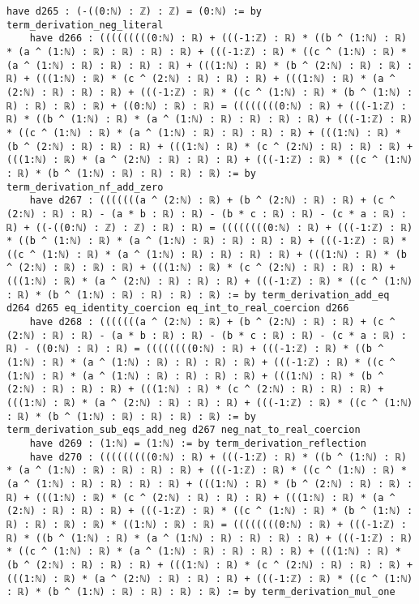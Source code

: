 \documentclass{article}
\begin{document}
\begin{tcolorbox}[colback=white!10, width=\linewidth]
\begin{lstlisting}[language=Lean4]
    have d265 : (-((0:ℕ) : ℤ) : ℤ) = (0:ℕ) := by term_derivation_neg_literal
    have d266 : (((((((((0:ℕ) : ℝ) + (((-1:ℤ) : ℝ) * ((b ^ (1:ℕ) : ℝ) * (a ^ (1:ℕ) : ℝ) : ℝ) : ℝ) : ℝ) + (((-1:ℤ) : ℝ) * ((c ^ (1:ℕ) : ℝ) * (a ^ (1:ℕ) : ℝ) : ℝ) : ℝ) : ℝ) + (((1:ℕ) : ℝ) * (b ^ (2:ℕ) : ℝ) : ℝ) : ℝ) + (((1:ℕ) : ℝ) * (c ^ (2:ℕ) : ℝ) : ℝ) : ℝ) + (((1:ℕ) : ℝ) * (a ^ (2:ℕ) : ℝ) : ℝ) : ℝ) + (((-1:ℤ) : ℝ) * ((c ^ (1:ℕ) : ℝ) * (b ^ (1:ℕ) : ℝ) : ℝ) : ℝ) : ℝ) + ((0:ℕ) : ℝ) : ℝ) = ((((((((0:ℕ) : ℝ) + (((-1:ℤ) : ℝ) * ((b ^ (1:ℕ) : ℝ) * (a ^ (1:ℕ) : ℝ) : ℝ) : ℝ) : ℝ) + (((-1:ℤ) : ℝ) * ((c ^ (1:ℕ) : ℝ) * (a ^ (1:ℕ) : ℝ) : ℝ) : ℝ) : ℝ) + (((1:ℕ) : ℝ) * (b ^ (2:ℕ) : ℝ) : ℝ) : ℝ) + (((1:ℕ) : ℝ) * (c ^ (2:ℕ) : ℝ) : ℝ) : ℝ) + (((1:ℕ) : ℝ) * (a ^ (2:ℕ) : ℝ) : ℝ) : ℝ) + (((-1:ℤ) : ℝ) * ((c ^ (1:ℕ) : ℝ) * (b ^ (1:ℕ) : ℝ) : ℝ) : ℝ) : ℝ) := by term_derivation_nf_add_zero
    have d267 : (((((((a ^ (2:ℕ) : ℝ) + (b ^ (2:ℕ) : ℝ) : ℝ) + (c ^ (2:ℕ) : ℝ) : ℝ) - (a * b : ℝ) : ℝ) - (b * c : ℝ) : ℝ) - (c * a : ℝ) : ℝ) + ((-((0:ℕ) : ℤ) : ℤ) : ℝ) : ℝ) = ((((((((0:ℕ) : ℝ) + (((-1:ℤ) : ℝ) * ((b ^ (1:ℕ) : ℝ) * (a ^ (1:ℕ) : ℝ) : ℝ) : ℝ) : ℝ) + (((-1:ℤ) : ℝ) * ((c ^ (1:ℕ) : ℝ) * (a ^ (1:ℕ) : ℝ) : ℝ) : ℝ) : ℝ) + (((1:ℕ) : ℝ) * (b ^ (2:ℕ) : ℝ) : ℝ) : ℝ) + (((1:ℕ) : ℝ) * (c ^ (2:ℕ) : ℝ) : ℝ) : ℝ) + (((1:ℕ) : ℝ) * (a ^ (2:ℕ) : ℝ) : ℝ) : ℝ) + (((-1:ℤ) : ℝ) * ((c ^ (1:ℕ) : ℝ) * (b ^ (1:ℕ) : ℝ) : ℝ) : ℝ) : ℝ) := by term_derivation_add_eq d264 d265 eq_identity_coercion eq_int_to_real_coercion d266
    have d268 : (((((((a ^ (2:ℕ) : ℝ) + (b ^ (2:ℕ) : ℝ) : ℝ) + (c ^ (2:ℕ) : ℝ) : ℝ) - (a * b : ℝ) : ℝ) - (b * c : ℝ) : ℝ) - (c * a : ℝ) : ℝ) - ((0:ℕ) : ℝ) : ℝ) = ((((((((0:ℕ) : ℝ) + (((-1:ℤ) : ℝ) * ((b ^ (1:ℕ) : ℝ) * (a ^ (1:ℕ) : ℝ) : ℝ) : ℝ) : ℝ) + (((-1:ℤ) : ℝ) * ((c ^ (1:ℕ) : ℝ) * (a ^ (1:ℕ) : ℝ) : ℝ) : ℝ) : ℝ) + (((1:ℕ) : ℝ) * (b ^ (2:ℕ) : ℝ) : ℝ) : ℝ) + (((1:ℕ) : ℝ) * (c ^ (2:ℕ) : ℝ) : ℝ) : ℝ) + (((1:ℕ) : ℝ) * (a ^ (2:ℕ) : ℝ) : ℝ) : ℝ) + (((-1:ℤ) : ℝ) * ((c ^ (1:ℕ) : ℝ) * (b ^ (1:ℕ) : ℝ) : ℝ) : ℝ) : ℝ) := by term_derivation_sub_eqs_add_neg d267 neg_nat_to_real_coercion
    have d269 : (1:ℕ) = (1:ℕ) := by term_derivation_reflection
    have d270 : (((((((((0:ℕ) : ℝ) + (((-1:ℤ) : ℝ) * ((b ^ (1:ℕ) : ℝ) * (a ^ (1:ℕ) : ℝ) : ℝ) : ℝ) : ℝ) + (((-1:ℤ) : ℝ) * ((c ^ (1:ℕ) : ℝ) * (a ^ (1:ℕ) : ℝ) : ℝ) : ℝ) : ℝ) + (((1:ℕ) : ℝ) * (b ^ (2:ℕ) : ℝ) : ℝ) : ℝ) + (((1:ℕ) : ℝ) * (c ^ (2:ℕ) : ℝ) : ℝ) : ℝ) + (((1:ℕ) : ℝ) * (a ^ (2:ℕ) : ℝ) : ℝ) : ℝ) + (((-1:ℤ) : ℝ) * ((c ^ (1:ℕ) : ℝ) * (b ^ (1:ℕ) : ℝ) : ℝ) : ℝ) : ℝ) * ((1:ℕ) : ℝ) : ℝ) = ((((((((0:ℕ) : ℝ) + (((-1:ℤ) : ℝ) * ((b ^ (1:ℕ) : ℝ) * (a ^ (1:ℕ) : ℝ) : ℝ) : ℝ) : ℝ) + (((-1:ℤ) : ℝ) * ((c ^ (1:ℕ) : ℝ) * (a ^ (1:ℕ) : ℝ) : ℝ) : ℝ) : ℝ) + (((1:ℕ) : ℝ) * (b ^ (2:ℕ) : ℝ) : ℝ) : ℝ) + (((1:ℕ) : ℝ) * (c ^ (2:ℕ) : ℝ) : ℝ) : ℝ) + (((1:ℕ) : ℝ) * (a ^ (2:ℕ) : ℝ) : ℝ) : ℝ) + (((-1:ℤ) : ℝ) * ((c ^ (1:ℕ) : ℝ) * (b ^ (1:ℕ) : ℝ) : ℝ) : ℝ) : ℝ) := by term_derivation_mul_one

\end{lstlisting}
\end{tcolorbox}
\end{document}

